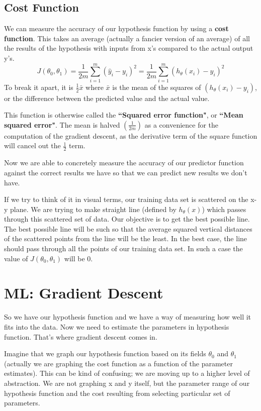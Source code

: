 \subsection{Cost Function}
We can measure the accuracy of our hypothesis function by using a {\bf cost function}. This takes an average (actually a fancier version of an average) of all the results of the hypothesis with inputs from x's compared to the actual output y's.
\begin{equation}
J(\theta_0, \theta_1) = \frac{1}{2m} \sum_{i=1}^m \left( \hat{y}_{i}- y_{i} \right)^2  = \frac{1}{2m} \sum_{i=1}^m \left( h_\theta (x_{i}) - y_{i} \right)^2
\end{equation}
To break it apart, it is $\frac{1}{2} \bar{x}$ where $\bar{x}$ is the mean of the squares of $(h_\theta (x_{i}) - y_{i})$, or the difference between the predicted value and the actual value.

This function is otherwise called the {\bf ``Squared error function"}, or {\bf ``Mean squared error"}. The mean is halved $\left(\frac{1}{2m}\right)$ as a convenience for the computation of the gradient descent, as the derivative term of the square function will cancel out the $\frac{1}{2}$ term.

Now we are able to concretely measure the accuracy of our predictor function against the correct results we have so that we can predict new results we don't have.

If we try to think of it in visual terms, our training data set is scattered on the x-y plane. We are trying to make straight line (defined by $h_\theta(x)$) which passes through this scattered set of data. Our objective is to get the best possible line. The best possible line will be such so that the average squared vertical distances of the scattered points from the line will be the least. In the best case, the line should pass through all the points of our training data set. In such a case the value of $J(\theta_0, \theta_1)$ will be 0.
\section{ML: Gradient Descent}
So we have our hypothesis function and we have a way of measuring how well it fits into the data. Now we need to estimate the parameters in hypothesis function. That's where gradient descent comes in.

Imagine that we graph our hypothesis function based on its fields $\theta_0$ and $\theta_1$ (actually we are graphing the cost function as a function of the parameter estimates). This can be kind of confusing; we are moving up to a higher level of abstraction. We are not graphing x and y itself, but the parameter range of our hypothesis function and the cost resulting from selecting particular set of parameters.


